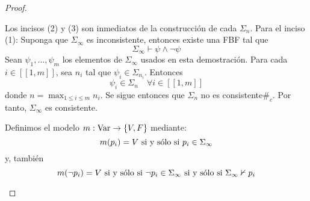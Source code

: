 \documentclass[12pt]{report}
\theoremstyle{largebreak}
\newcommand\cf[3]{\ensuremath{#1:#2\rightarrow#3}}
\newcommand\contradiction{\ensuremath{\#_c}}
\newcommand\natint[1]{\ensuremath{\left[\!\left[ #1\right]\!\right]}}
\begin{document}
\begin{proof}
\begin{itemize}
\begin{enumerate}
            \end{enumerate}
            Los incisos (2) y (3) son inmediatos de la construcción de cada $\Sigma_n$. Para el inciso (1): Suponga que $\Sigma_\infty$ es inconsistente, entonces existe una FBF tal que
            \begin{equation*}
                \Sigma_\infty\vdash\psi\land\neg\psi
            \end{equation*}
            Sean $\psi_1,...,\psi_m$ los elementos de $\Sigma_\infty$ usados en esta demostración. Para cada $i\in\natint{1,m}$, sea $n_i$ tal que $\psi_i\in\Sigma_{ n_i}$. Entonces
            \begin{equation*}
                \psi_i\in\Sigma_{n}\quad\forall i\in\natint{1,m}
            \end{equation*}
            donde $n=\max_{1\leq i\leq m}n_i$. Se sigue entonces que $\Sigma_n$ no es consistente\contradiction. Por tanto, $\Sigma_\infty$ es consistente.

            Definimos el modelo $\cf{m}{\textup{Var}}{\left\{V,F\right\}}$ mediante:
            \begin{equation*}
                m(p_i)=V\textup{ si y sólo si }p_i\in\Sigma_{\infty}
            \end{equation*}
            y, también
            \begin{equation*}
                m(\neg p_i)=V\textup{ si y sólo si }\neg p_i\in\Sigma_{\infty}\textup{ si y sólo si }\Sigma_\infty\nvdash p_i
            \end{equation*}


\end{itemize}
\end{proof}
\end{document}
